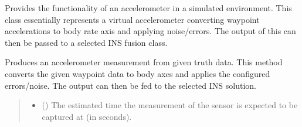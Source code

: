 \documentclass[letterpaper,10pt,english]{sphinxmanual}
\begin{document}
\begin{fulllineitems}
\label{\detokenize{modules/measurement/accelerometer:qnav.measurement.accelerometer.Accelerometer}}
\pysigstartsignatures
{}
\pysigstopsignatures
\sphinxAtStartPar
Provides the functionality of an accelerometer in a simulated environment.
This class essentially represents a virtual accelerometer converting
waypoint accelerations to body rate axis and applying noise/errors.
The output of this can then be passed to a selected INS fusion class.

\begin{fulllineitems}
\label{\detokenize{modules/measurement/accelerometer:qnav.measurement.accelerometer.Accelerometer.take_measurement}}
\pysigstartsignatures
{}
\pysigstopsignatures
\sphinxAtStartPar
Produces an accelerometer measurement from given truth data.
This method converts the given waypoint data to body axes and
applies the configured errors/noise. The output can then be
fed to the selected INS solution.
\begin{quote}\begin{description}
\begin{itemize}
\item {} 
\sphinxAtStartPar
{} () \textendash{} The estimated time the measurement of the sensor
is expected to be captured at (in seconds).


\end{itemize}
\end{description}
\end{quote}
\end{fulllineitems}
\end{fulllineitems}
\end{document}
